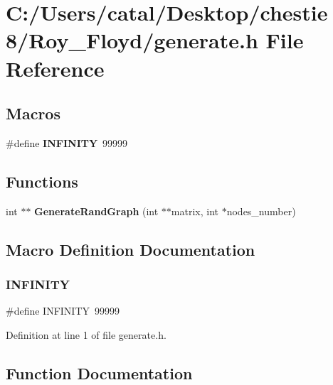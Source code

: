 \section{C\+:/\+Users/catal/\+Desktop/chestie 8/\+Roy\+\_\+\+Floyd/generate.h File Reference}
\label{generate_8h}
\subsection*{Macros}
\begin{DoxyCompactItemize}
\item 
\#define \textbf{ I\+N\+F\+I\+N\+I\+TY}~99999
\end{DoxyCompactItemize}
\subsection*{Functions}
\begin{DoxyCompactItemize}
\item 
int $\ast$$\ast$ \textbf{ Generate\+Rand\+Graph} (int $\ast$$\ast$matrix, int $\ast$nodes\+\_\+number)
\end{DoxyCompactItemize}


\subsection{Macro Definition Documentation}
\mbox{\label{generate_8h_a956e2723d559858d08644ac99146e910}} 
\subsubsection{I\+N\+F\+I\+N\+I\+TY}
{\footnotesize\ttfamily \#define I\+N\+F\+I\+N\+I\+TY~99999}



Definition at line 1 of file generate.\+h.



\subsection{Function Documentation}
\mbox{\label{generate_8h_a8d4ea219645520f49f17ec81bb16ef93}} 
